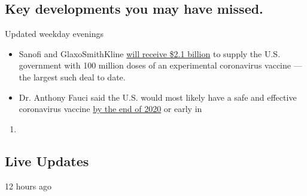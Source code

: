 \hypertarget{key-developments-you-may-have-missed}{%
\subsection{Key developments you may have
missed.}\label{key-developments-you-may-have-missed}}

Updated weekday evenings

\begin{itemize}
\tightlist
\item
  Sanofi and GlaxoSmithKline
  \href{https://www.nytimes.com/2020/07/31/health/covid-19-vaccine-sanofi-gsk.html}{will
  receive \$2.1 billion} to supply the U.S. government with 100 million
  doses of an experimental coronavirus vaccine --- the largest such deal
  to date.
\item
  Dr. Anthony Fauci said the U.S. would most likely have a safe and
  effective coronavirus vaccine
  \href{https://www.nytimes.com/aponline/2020/07/31/us/politics/ap-us-virus-outbreak-fauci.html}{by
  the end of 2020} or early in
\end{itemize}

\begin{enumerate}
\def\labelenumi{\arabic{enumi}.}
\setcounter{enumi}{2020}
\item
\end{enumerate}

\hypertarget{live-updates}{%
\subsection{Live Updates}\label{live-updates}}

12 hours ago

